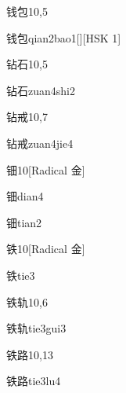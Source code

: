 \begin{entry}{钱包}{10,5}
  \begin{phonetics}{钱包}{qian2bao1}[][HSK 1]
  \end{phonetics}
\end{entry}

\begin{entry}{钻石}{10,5}
  \begin{phonetics}{钻石}{zuan4shi2}
  \end{phonetics}
\end{entry}

\begin{entry}{钻戒}{10,7}
  \begin{phonetics}{钻戒}{zuan4jie4}
  \end{phonetics}
\end{entry}

\begin{entry}{钿}{10}[Radical 金]
  \begin{phonetics}{钿}{dian4}
  \end{phonetics}
  \begin{phonetics}{钿}{tian2}
  \end{phonetics}
\end{entry}

\begin{entry}{铁}{10}[Radical 金]
  \begin{phonetics}{铁}{tie3}
  \end{phonetics}
\end{entry}

\begin{entry}{铁轨}{10,6}
  \begin{phonetics}{铁轨}{tie3gui3}
  \end{phonetics}
\end{entry}

\begin{entry}{铁路}{10,13}
  \begin{phonetics}{铁路}{tie3lu4}
  \end{phonetics}
\end{entry}

